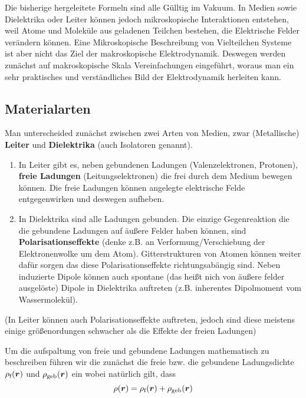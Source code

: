 Die bisherige hergeleitete Formeln sind alle Gülltig im Vakuum. In Medien
sowie Dielektrika oder Leiter können jedoch mikroskopische Interaktionen
entstehen, weil Atome und Moleküle aus geladenen Teilchen bestehen, die
Elektrische Felder verändern können. 
Eine Mikroskopische Beschreibung von Vielteilchen Systeme ist aber nicht
das Ziel der makroskopische Elektrodynamik. 
Deswegen werden zunächst auf makroskopische Skala
Vereinfachungen eingeführt, woraus man ein sehr 
praktisches und verständliches Bild der Elektrodynamik herleiten kann.

\subsection{Materialarten}%
Man unterscheided zunächst zwischen zwei Arten von Medien, zwar 
(Metallische) 
\textbf{Leiter} und \textbf{Dielektrika} (auch Isolatoren genannt). 

\begin{enumerate}
  \item In Leiter gibt es, 
neben gebundenen Ladungen (Valenzelektronen, Protonen), 
\textbf{freie Ladungen} (Leitungselektronen) die 
frei durch dem Medium bewegen können. Die freie Ladungen können angelegte
elektrische Felde entgegenwirken und deswegen aufheben.
  \item In Dielektrika sind alle Ladungen gebunden. Die einzige Gegenreaktion 
    die die gebundene Ladungen auf äußere Felder haben können, 
sind \textbf{Polarisationseffekte} (denke z.B. an Verformung/Verschiebung der 
Elektronenwolke um dem Atom). Gitterstrukturen von Atomen können weiter
dafür sorgen das diese Polarisationseffekte richtungsabängig sind. Neben
induzierte Dipole können auch spontane (das heißt nich von äußere felder
ausgelöste) Dipole in Dielektrika auftreten (z.B. inherentes 
Dipolmoment vom Wassermolekül).
\end{enumerate}
(In Leiter können auch Polarisationseffekte auftreten, jedoch sind diese
meistens einige größenordungen schwacher als die Effekte der freien Ladungen)

Um die aufspaltung von freie und gebundene Ladungen mathematisch zu 
beschreiben
führen wir die zunächst die freie bzw. die gebundene Ladungsdichte 
$\rho_\text{f}(\vb*r)$ und $\rho_\text{geb}(\vb*r)$ ein 
wobei natürlich gilt, dass
\begin{equation}
  \label{eq:ladungsdiche-geb-frei}
  \rho(\vb*r) = \rho_\text{f}(\vb*r) + \rho_\text{geb}(\vb*r)
\end{equation}


